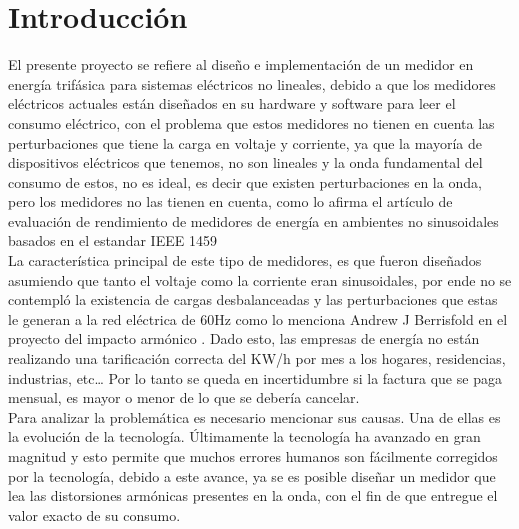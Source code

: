 

\newpage{\clearpage}
\chapter{ Introducción}

El presente proyecto se refiere al diseño e implementación de un medidor en energía trifásica para sistemas eléctricos no lineales, debido a que los medidores eléctricos actuales están diseñados en su hardware y software para leer el consumo eléctrico, con el problema que estos medidores no tienen en cuenta las perturbaciones que tiene la carga en voltaje y corriente, ya que la mayoría de dispositivos eléctricos que tenemos, no son lineales y la onda fundamental del consumo de estos, no es ideal, es decir que existen perturbaciones en la onda, pero los medidores no las tienen en cuenta, como lo afirma el artículo de evaluación de rendimiento de medidores de energía en ambientes no sinusoidales basados en el estandar IEEE 1459 \cite{A42} \\

La característica principal de este tipo de medidores, es que fueron diseñados asumiendo que tanto el voltaje como la corriente eran sinusoidales, por ende no se contempló la existencia de cargas desbalanceadas y las perturbaciones que estas le generan a la red eléctrica de 60Hz como lo menciona Andrew J Berrisfold en el proyecto del impacto armónico \cite{A43}. Dado esto, las empresas de energía no están realizando una tarificación correcta del KW/h por mes a los hogares, residencias, industrias, etc… Por lo tanto se queda en incertidumbre si la factura que se paga mensual, es mayor o menor de lo que se debería cancelar.\\

Para analizar la problemática es necesario mencionar sus causas. Una de ellas es la evolución de la tecnología. Últimamente la tecnología ha avanzado en gran magnitud y esto permite que muchos errores humanos son fácilmente corregidos por la tecnología, debido a este avance, ya se es posible diseñar un medidor que lea las distorsiones armónicas presentes en la onda, con el fin de que entregue el valor exacto de su consumo.\\


